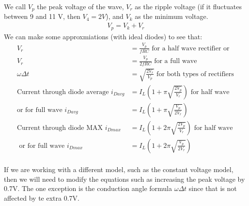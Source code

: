 \documentclass[12pt,letterpaper]{article} \usepackage{amsmath} \usepackage{graphicx} \usepackage[margin=1in]{geometry} \usepackage{longtable}  \usepackage{amssymb}
\begin{document}
	We call $V_p$ the peak voltage of the wave, $V_r$ as the ripple voltage (if it fluctuates between 9 and 11 V, then $V_4=2V$), and $V_k$ as the minimum voltage.
	\begin{align*}
		V_p = V_k + V_r
	\end{align*}
	We can make some approxmiations (with ideal diodes) to see that:
	\begin{align*}
		V_r &= \frac{V_p}{fRC} \text{ for a half wave rectifier or } \\
		V_r &= \frac{V_p}{2fRC} \text{ for a full wave }\\
		\omega\Delta t &= \sqrt{\frac{2V_r}{V_p}} \text{ for both types of rectifiers}\\
		\text{Current through diode average }i_{Davg} &= I_L(1+\pi\sqrt{\frac{2V_p}{V_r}}) \text { for half wave} \\ 
		\text{or for full wave } i_{Davg} &= I_L (1+\pi\sqrt{\frac{V_p}{2V_r}}) \\
		\text{Current through diode MAX }i_{Dmax} &= I_L(1+2\pi\sqrt{\frac{2V_p}{V_r}}) \text{ for half wave }\\ 
		\text { or for full wave } i_{Dmax} &= I_L (1+2\pi\sqrt{\frac{V_p}{2V_r}}) \\
	\end{align*}

	If we are working with a different model, such as the constant voltage model, then we will need to modify the equations such as increasing the peak voltage by 0.7V. The one exception is the conduction angle formula $\omega \Delta t$ since that is not affected by te extra 0.7V.
	
\end{document}
